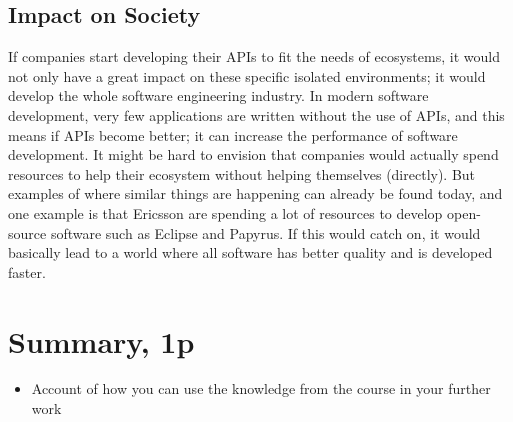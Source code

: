 \documentclass{article}
\begin{document}
\subsection{Impact on Society}
If companies start developing their APIs to fit the needs of ecosystems, it would not only have a great impact on these specific isolated environments; it would develop the whole software engineering industry. In modern software development, very few applications are written without the use of APIs, and this means if APIs become better; it can increase the performance of software development. It might be hard to envision that companies would actually spend resources to help their ecosystem without helping themselves (directly). But examples of where similar things are happening can already be found today, and one example is that Ericsson are spending a lot of resources to develop open-source software such as Eclipse and Papyrus. If this would catch on, it would basically lead to a world where all software has better quality and is developed faster. 

\section{Summary, 1p}

\begin{itemize}
	\item Account of how you can use the knowledge from the course in your further work
\end{itemize}
\end{document}
